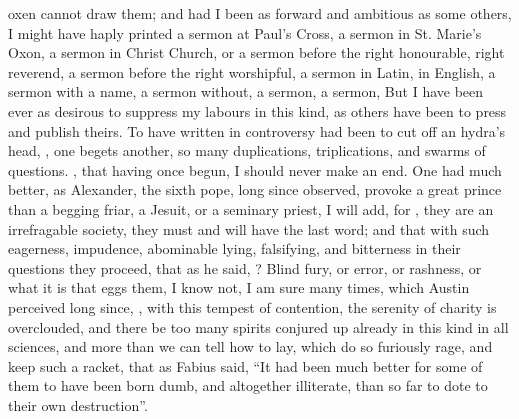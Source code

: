 oxen cannot draw them; and had I been as forward and ambitious as some others,
I might have haply printed a sermon at Paul's Cross, a sermon in St. Marie's
Oxon, a sermon in Christ Church, or a sermon before the right honourable, right
reverend, a sermon before the right worshipful, a sermon in Latin, in English,
a sermon with a name, a sermon without, a sermon, a sermon, \etc{} But I have
been ever as desirous to suppress my labours in this kind, as others have been
to press and publish theirs. To have written in controversy had been to cut off
an hydra's head, , one begets
another, so many duplications, triplications, and swarms of questions. , that having once begun, I should
never make an end. One had much better, as Alexander, the
sixth pope, long since observed, provoke a great prince than a begging friar, a
Jesuit, or a seminary priest, I will add, for , they are an irrefragable society, they must and will have the last
word; and that with such eagerness, impudence, abominable lying, falsifying,
and bitterness in their questions they proceed, that as he
said, ? Blind fury, or error, or rashness, or what it is that eggs
them, I know not, I am sure many times, which Austin
perceived long since, , with this tempest of contention, the serenity of charity is
overclouded, and there be too many spirits conjured up already in this kind in
all sciences, and more than we can tell how to lay, which do so furiously rage,
and keep such a racket, that as Fabius said, \enquote{It had been
much better for some of them to have been born dumb, and altogether illiterate,
than so far to dote to their own destruction}.


